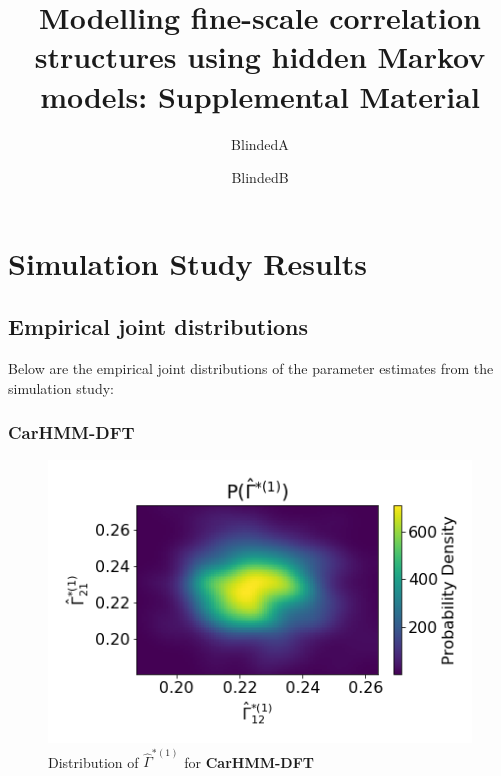 \documentclass[12pt]{TD-CJS}
\begin{document}

\renewcommand{\eqref}[1]{(\ref{#1})}
\newcommand{\mb}[1]{\mathbf{#1}}
\newcommand{\mbb}[1]{\mathbb{#1}}
\newcommand{\mt}[1]{\mathrm{#1}}
\newcommand{\rv}{random variable}
\newcommand{\newblock}{}


\title[]{Modelling fine-scale correlation structures using hidden Markov models: Supplemental Material}%
\author{BlindedA\thanksref{*}}
\author{BlindedB}


\makechaptertitle

\section{Simulation Study Results}

\subsection{Empirical joint distributions}

Below are the empirical joint distributions of the parameter estimates from the simulation study:

\subsubsection{CarHMM-DFT}

\begin{figure}
    \centering
    \includegraphics[width=5in]{../Plots/hmm_FV_Gamma_density_0.png}
    \caption{Distribution of $\hat \Gamma^{*(1)}$ for \textbf{CarHMM-DFT}}
\end{figure}
\end{document}
